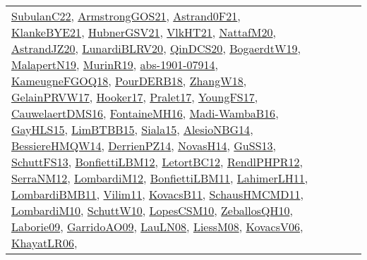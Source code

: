 {\begin{longtable}{llp{6cm}p{6cm}p{6cm}}
\href{articles/SubulanC22.pdf}{SubulanC22}\cite{SubulanC22}, \href{papers/ArmstrongGOS21.pdf}{ArmstrongGOS21}\cite{ArmstrongGOS21}, \href{papers/Astrand0F21.pdf}{Astrand0F21}\cite{Astrand0F21}, \href{papers/KlankeBYE21.pdf}{KlankeBYE21}\cite{KlankeBYE21}, \href{articles/HubnerGSV21.pdf}{HubnerGSV21}\cite{HubnerGSV21}, \href{articles/VlkHT21.pdf}{VlkHT21}\cite{VlkHT21}, \href{papers/NattafM20.pdf}{NattafM20}\cite{NattafM20}, \href{articles/AstrandJZ20.pdf}{AstrandJZ20}\cite{AstrandJZ20}, \href{articles/LunardiBLRV20.pdf}{LunardiBLRV20}\cite{LunardiBLRV20}, \href{articles/QinDCS20.pdf}{QinDCS20}\cite{QinDCS20}, \href{papers/BogaerdtW19.pdf}{BogaerdtW19}\cite{BogaerdtW19}, \href{papers/MalapertN19.pdf}{MalapertN19}\cite{MalapertN19}, \href{papers/MurinR19.pdf}{MurinR19}\cite{MurinR19}, \href{articles/abs-1901-07914.pdf}{abs-1901-07914}\cite{abs-1901-07914}, \href{papers/KameugneFGOQ18.pdf}{KameugneFGOQ18}\cite{KameugneFGOQ18}, \href{articles/PourDERB18.pdf}{PourDERB18}\cite{PourDERB18}, \href{articles/ZhangW18.pdf}{ZhangW18}\cite{ZhangW18}, \href{papers/GelainPRVW17.pdf}{GelainPRVW17}\cite{GelainPRVW17}, \href{papers/Hooker17.pdf}{Hooker17}\cite{Hooker17}, \href{papers/Pralet17.pdf}{Pralet17}\cite{Pralet17}, \href{papers/YoungFS17.pdf}{YoungFS17}\cite{YoungFS17}, \href{papers/CauwelaertDMS16.pdf}{CauwelaertDMS16}\cite{CauwelaertDMS16}, \href{papers/FontaineMH16.pdf}{FontaineMH16}\cite{FontaineMH16}, \href{papers/Madi-WambaB16.pdf}{Madi-WambaB16}\cite{Madi-WambaB16}, \href{papers/GayHLS15.pdf}{GayHLS15}\cite{GayHLS15}, \href{papers/LimBTBB15.pdf}{LimBTBB15}\cite{LimBTBB15}, \href{articles/Siala15.pdf}{Siala15}\cite{Siala15}, \href{papers/AlesioNBG14.pdf}{AlesioNBG14}\cite{AlesioNBG14}, \href{papers/BessiereHMQW14.pdf}{BessiereHMQW14}\cite{BessiereHMQW14}, \href{papers/DerrienPZ14.pdf}{DerrienPZ14}\cite{DerrienPZ14}, \href{articles/NovasH14.pdf}{NovasH14}\cite{NovasH14}, \href{papers/GuSS13.pdf}{GuSS13}\cite{GuSS13}, \href{papers/SchuttFS13.pdf}{SchuttFS13}\cite{SchuttFS13}, \href{papers/BonfiettiLBM12.pdf}{BonfiettiLBM12}\cite{BonfiettiLBM12}, \href{papers/LetortBC12.pdf}{LetortBC12}\cite{LetortBC12}, \href{papers/RendlPHPR12.pdf}{RendlPHPR12}\cite{RendlPHPR12}, \href{papers/SerraNM12.pdf}{SerraNM12}\cite{SerraNM12}, \href{articles/LombardiM12.pdf}{LombardiM12}\cite{LombardiM12}, \href{papers/BonfiettiLBM11.pdf}{BonfiettiLBM11}\cite{BonfiettiLBM11}, \href{papers/LahimerLH11.pdf}{LahimerLH11}\cite{LahimerLH11}, \href{papers/LombardiBMB11.pdf}{LombardiBMB11}\cite{LombardiBMB11}, \href{papers/Vilim11.pdf}{Vilim11}\cite{Vilim11}, \href{articles/KovacsB11.pdf}{KovacsB11}\cite{KovacsB11}, \href{articles/SchausHMCMD11.pdf}{SchausHMCMD11}\cite{SchausHMCMD11}, \href{papers/LombardiM10.pdf}{LombardiM10}\cite{LombardiM10}, \href{papers/SchuttW10.pdf}{SchuttW10}\cite{SchuttW10}, \href{articles/LopesCSM10.pdf}{LopesCSM10}\cite{LopesCSM10}, \href{articles/ZeballosQH10.pdf}{ZeballosQH10}\cite{ZeballosQH10}, \href{papers/Laborie09.pdf}{Laborie09}\cite{Laborie09}, \href{articles/GarridoAO09.pdf}{GarridoAO09}\cite{GarridoAO09}, \href{papers/LauLN08.pdf}{LauLN08}\cite{LauLN08}, \href{articles/LiessM08.pdf}{LiessM08}\cite{LiessM08}, \href{papers/KovacsV06.pdf}{KovacsV06}\cite{KovacsV06}, \href{articles/KhayatLR06.pdf}{KhayatLR06}\cite{KhayatLR06}, 
\end{longtable}}

